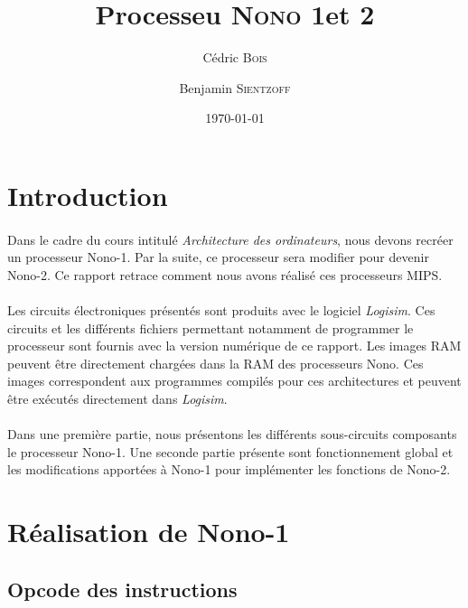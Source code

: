 \documentclass[a4paper]{article}
\title{Processeu \textsc{Nono} 1et 2}
\author{Cédric \textsc{Bois} \and Benjamin \textsc{Sientzoff}}
\date{\today}
\begin{document}
	\maketitle
	\newpage
	\tableofcontents
	\newpage %
	
	\section*{Introduction}

		\paragraph{}{
		Dans le cadre du cours intitulé \textit{Architecture des ordinateurs}, nous devons recréer
		un processeur Nono-1. Par la suite, ce processeur sera modifier pour devenir Nono-2. Ce 
		rapport retrace comment nous avons réalisé ces processeurs MIPS.
		}
		
		\paragraph{}{
		Les circuits électroniques présentés sont produits avec le logiciel \textit{Logisim}. Ces
		circuits et les différents fichiers permettant notamment de programmer le processeur sont 
		fournis avec la version numérique de ce rapport. Les images RAM peuvent être directement 
		chargées dans la RAM des processeurs Nono. Ces images correspondent aux programmes 
		compilés pour ces architectures et peuvent être exécutés directement dans \textit{Logisim}.
		}
		
		\paragraph{}{
		Dans une première partie, nous présentons les différents sous-circuits composants le 
		processeur Nono-1. Une seconde partie présente sont fonctionnement global et les 
		modifications apportées à Nono-1 pour implémenter les fonctions de Nono-2.
		}
	
	\newpage
	\section{Réalisation de Nono-1}
	
		\subsection{Opcode des instructions}
			
\end{document}
